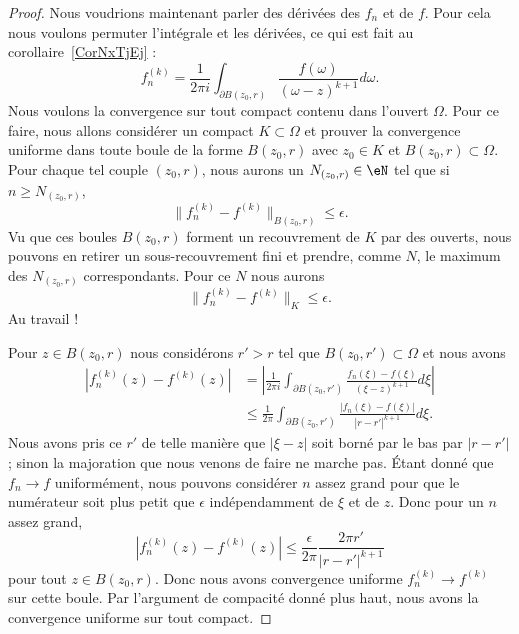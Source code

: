 \begin{proof}
    Nous voudrions maintenant parler des dérivées des \( f_n\) et de \( f\). Pour cela nous voulons permuter l'intégrale et les dérivées, ce qui est fait au corollaire~\ref{CorNxTjEj} :
    \begin{equation}
        f_n^{(k)}=\frac{1}{ 2\pi i }\int_{\partial B(z_0,r)}\frac{ f(\omega) }{ (\omega-z)^{k+1} }d\omega.
    \end{equation}
    Nous voulons la convergence sur tout compact contenu dans l'ouvert \( \Omega\). Pour ce faire, nous allons considérer un compact \( K\subset \Omega\) et prouver la convergence uniforme dans toute boule de la forme \( B(z_0,r)\) avec \( z_0\in K\) et \( B(z_0,r)\subset \Omega\). Pour chaque tel couple \( (z_0,r)\), nous aurons un \( N_{(z_0,r)}\in \eN\) tel que si \( n\geq N_{(z_0,r)}\),
    \begin{equation}
        \| f_n^{(k)}-f^{(k)} \|_{B(z_0,r)}\leq \epsilon.
    \end{equation}
    Vu que ces boules \( B(z_0,r)\) forment un recouvrement de \( K\) par des ouverts, nous pouvons en retirer un sous-recouvrement fini et prendre, comme \( N\), le maximum des \( N_{(z_0,r)}\) correspondants. Pour ce \( N\) nous aurons
    \begin{equation}
        \| f_n^{(k)}-f^{(k)} \|_K\leq \epsilon.
    \end{equation}
    Au travail !

    Pour \( z\in B(z_0,r)\) nous considérons \( r'>r\) tel que \( B(z_0,r')\subset \Omega\) et nous avons
    \begin{subequations}
        \begin{align}
            | f^{(k)}_n(z)-f^{(k)}(z) |&=\left| \frac{1}{ 2\pi i }\int_{\partial B(z_0,r')}\frac{ f_n(\xi)-f(\xi) }{ (\xi-z)^{k+1} }d\xi \right| \\
            &\leq\frac{1}{ 2\pi }\int_{\partial B(z_0,r')}\frac{ | f_n(\xi)-f(\xi) | }{ | r-r' |^{k+1} }d\xi.
        \end{align}
    \end{subequations}
    Nous avons pris ce \( r'\) de telle manière que \( | \xi-z |\) soit borné par le bas par \( | r-r' |\); sinon la majoration que nous venons de faire ne marche pas. Étant donné que \( f_n\to f\) uniformément, nous pouvons considérer \( n\) assez grand pour que le numérateur soit plus petit que \( \epsilon\) indépendamment de \( \xi\) et de \( z\). Donc pour un \( n\) assez grand,
    \begin{equation}
        | f^{(k)}_n(z)-f^{(k)}(z) |\leq \frac{ \epsilon }{ 2\pi }\frac{ 2\pi r' }{ | r-r' |^{k+1} }
    \end{equation}
    pour tout \( z\in B(z_0,r)\). Donc nous avons convergence uniforme \( f_n^{(k)}\to f^{(k)}\) sur cette boule. Par l'argument de compacité donné plus haut, nous avons la convergence uniforme sur tout compact.
\end{proof}

